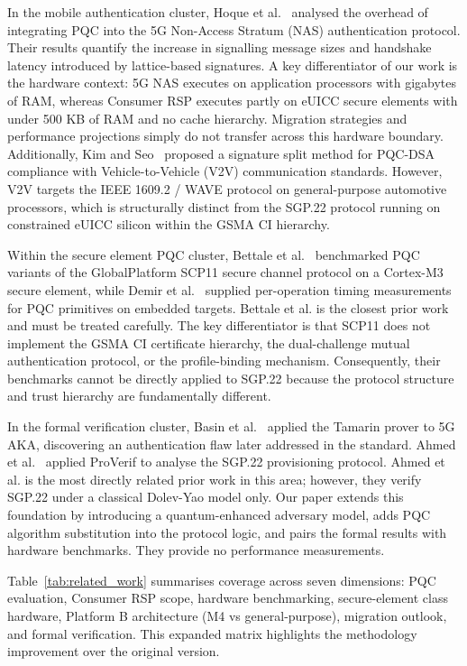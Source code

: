 \documentclass[a4paper,fleqn]{cas-sc}
\begin{document}
In the mobile authentication cluster, Hoque et al.~\cite{hoque2025pqc5g} analysed
the overhead of integrating PQC into the 5G Non-Access Stratum (NAS)
authentication protocol. Their results quantify the increase in signalling
message sizes and handshake latency introduced by lattice-based
signatures. A key differentiator of our work is the hardware context: 5G NAS
executes on application processors with gigabytes of RAM, whereas Consumer
RSP executes partly on eUICC secure elements with under 500 KB of RAM and
no cache hierarchy. Migration strategies and performance projections simply
do not transfer across this hardware boundary. Additionally, Kim and Seo~\cite{kim2022signature}
proposed a signature split method for PQC-DSA compliance with Vehicle-to-Vehicle (V2V)
communication standards. However, V2V targets the IEEE 1609.2 / WAVE protocol
on general-purpose automotive processors, which is structurally distinct from
the SGP.22 protocol running on constrained eUICC silicon within the GSMA CI hierarchy.

Within the secure element PQC cluster, Bettale et al.~\cite{bettale2025pqesim}
benchmarked PQC variants of the GlobalPlatform SCP11 secure channel
protocol on a Cortex-M3 secure element, while Demir et al.~\cite{demir2025pqc}
supplied per-operation timing measurements for PQC primitives on
embedded targets. Bettale et al. is the closest prior work and must be treated
carefully. The key differentiator is that SCP11 does not implement the GSMA CI
certificate hierarchy, the dual-challenge mutual authentication protocol, or the
profile-binding mechanism. Consequently, their benchmarks cannot be directly
applied to SGP.22 because the protocol structure and trust hierarchy are
fundamentally different.

In the formal verification cluster, Basin et al.~\cite{basin2018formal} applied
the Tamarin prover to 5G AKA, discovering an authentication flaw later addressed
in the standard. Ahmed et al.~\cite{ahmed2024rsp} applied ProVerif to analyse the
SGP.22 provisioning protocol. Ahmed et al. is the most directly related prior work
in this area; however, they verify SGP.22 under a classical Dolev-Yao model only.
Our paper extends this foundation by introducing a quantum-enhanced adversary model,
adds PQC algorithm substitution into the protocol logic, and pairs the formal results
with hardware benchmarks. They provide no performance measurements.

Table~\ref{tab:related_work} summarises coverage across seven dimensions:
PQC evaluation, Consumer RSP scope, hardware benchmarking, secure-element
class hardware, Platform B architecture (M4 vs general-purpose),
migration outlook, and formal verification. This expanded matrix
highlights the methodology improvement over the original version.
\end{document}
